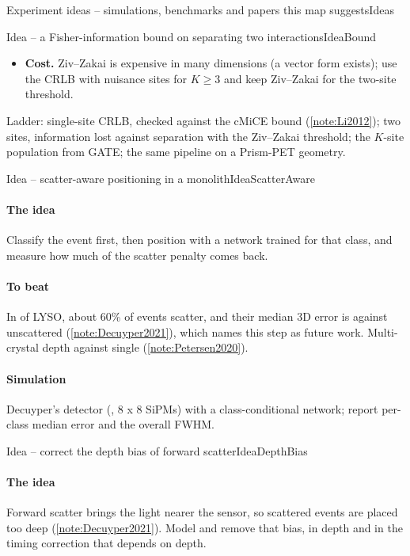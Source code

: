 \begin{programnote}{Experiment ideas -- simulations, benchmarks and papers this map suggests}{Ideas}
\begin{papernote}{Idea -- a Fisher-information bound on separating two interactions}{IdeaBound}
\begin{itemize}
		ordering use them, so the monolith should too.
	\item \textbf{Cost.} Ziv--Zakai is expensive in many dimensions (a vector
		form exists); use the CRLB with nuisance sites for $K \ge 3$ and keep
		Ziv--Zakai for the two-site threshold.
\end{itemize}
Ladder: single-site CRLB, checked against the cMiCE bound
(\ref{note:Li2012}); two sites, information lost against separation with the
Ziv--Zakai threshold; the $K$-site population from GATE; the same pipeline on
a Prism-PET geometry.
\end{papernote}

\begin{papernote}{Idea -- scatter-aware positioning in a monolith}{IdeaScatterAware}
\paragraph{The idea}
Classify the event first, then position with a network trained for that class,
and measure how much of the scatter penalty comes back.

\paragraph{To beat}
In  of LYSO, about 60\% of events scatter, and their median 3D error is
 against  unscattered (\ref{note:Decuyper2021}), which names
this step as future work. Multi-crystal depth  against 
single (\ref{note:Petersen2020}).

\paragraph{Simulation}
Decuyper's detector (, 8 x 8 SiPMs) with a
class-conditional network; report per-class median error and the overall FWHM.
\end{papernote}

\begin{papernote}{Idea -- correct the depth bias of forward scatter}{IdeaDepthBias}
\paragraph{The idea}
Forward scatter brings the light nearer the sensor, so scattered events are
placed too deep (\ref{note:Decuyper2021}). Model and remove that bias, in
depth and in the timing correction that depends on depth.


\end{papernote}
\end{programnote}
